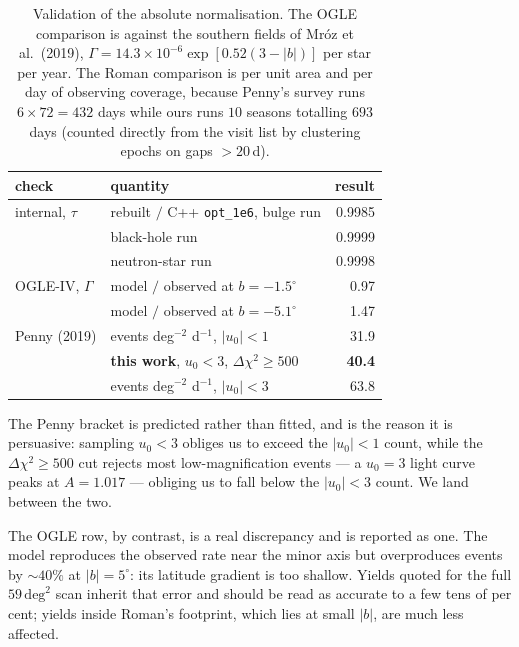 \documentclass[english,10pt,a4paper]{article}
\begin{document}
\begin{table}[h]
\centering
\caption{Validation of the absolute normalisation. The OGLE comparison is against the southern
fields of Mr\'oz et al.\ (2019), $\Gamma = 14.3\times10^{-6}\exp[0.52(3-|b|)]$ per star per year.
The Roman comparison is per unit area and per day of observing coverage, because Penny's survey
runs $6\times72 = 432$ days while ours runs $10$ seasons totalling $693$ days (counted directly
from the visit list by clustering epochs on gaps $>20$\,d).}
\label{tab:yieldcheck}
\begin{tabular}{llr}
\toprule
check & quantity & result \\
\midrule
internal, $\tau$   & rebuilt $/$ C++ \texttt{opt\_1e6}, bulge run & 0.9985 \\
                   & \quad black-hole run                        & 0.9999 \\
                   & \quad neutron-star run                      & 0.9998 \\
\midrule
OGLE-IV, $\Gamma$  & model $/$ observed at $b = -1.5^\circ$      & 0.97 \\
                   & model $/$ observed at $b = -5.1^\circ$      & 1.47 \\
\midrule
Penny (2019)       & events deg$^{-2}$ d$^{-1}$, $|u_0|<1$       & 31.9 \\
                   & \textbf{this work}, $u_0<3$, $\Delta\chi^2\ge500$ & \textbf{40.4} \\
                   & events deg$^{-2}$ d$^{-1}$, $|u_0|<3$       & 63.8 \\
\bottomrule
\end{tabular}
\end{table}

The Penny bracket is predicted rather than fitted, and is the reason it is persuasive: sampling
$u_0<3$ obliges us to exceed the $|u_0|<1$ count, while the $\Delta\chi^2\ge500$ cut rejects most
low-magnification events --- a $u_0=3$ light curve peaks at $A=1.017$ --- obliging us to fall
below the $|u_0|<3$ count. We land between the two.

The OGLE row, by contrast, is a real discrepancy and is reported as one. The model reproduces the
observed rate near the minor axis but overproduces events by $\sim\!40\%$ at $|b|=5^\circ$: its
latitude gradient is too shallow. Yields quoted for the full $59\,\mathrm{deg}^2$ scan inherit
that error and should be read as accurate to a few tens of per cent; yields inside Roman's
footprint, which lies at small $|b|$, are much less affected.
\end{document}
